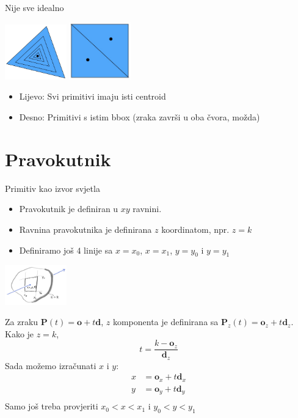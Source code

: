 \documentclass[9pt]{beamer}
\begin{document}
\begin{frame}{Nije sve idealno}
	\begin{center}
		\includegraphics[width=0.2\textwidth]{slike/slide_034_a.jpg}
		\qquad
		\includegraphics[width=0.2\textwidth]{slike/slide_034_b.jpg}
	\end{center}
\begin{itemize}
	\item Lijevo: Svi primitivi imaju isti centroid
	\item Desno: Primitivi s istim bbox (zraka završi u oba čvora, možda)
\end{itemize}
\end{frame}

\section{Pravokutnik}
\begin{frame}{Primitiv kao izvor svjetla}
	\begin{itemize}
		\item Pravokutnik je definiran u $xy$ ravnini.
		\item Ravnina pravokutnika je definirana $z$ koordinatom, npr. $z=k$
		\item Definiramo još $4$ linije sa $x=x_0$, $x=x_1$, $y=y_0$ i $y=y_1$
	\end{itemize}
	\begin{center}
		\includegraphics[width=0.2\textwidth]{slike/fig.ray-rect.jpg}
	\end{center}

	Za zraku $\mathbf{P}(t) = \mathbf{o} + t\mathbf{d}$, $z$ komponenta je definirana sa $\mathbf{P}_z(t) = \mathbf{o}_z + t\mathbf{d}_z$. Kako je $z=k$,
	$$
	t = \frac{k-\mathbf{o}_z}{\mathbf{d}_z}
	$$
	Sada možemo izračunati $x$ i $y$:
	\begin{align*}
	x &= \mathbf{o}_x + t\mathbf{d}_x \\
	y &= \mathbf{o}_y + t\mathbf{d}_y \\
	\end{align*}
	Samo još treba provjeriti $x_0 < x < x_1$ i $y_0 < y < y_1$
\end{frame}
\end{document}
